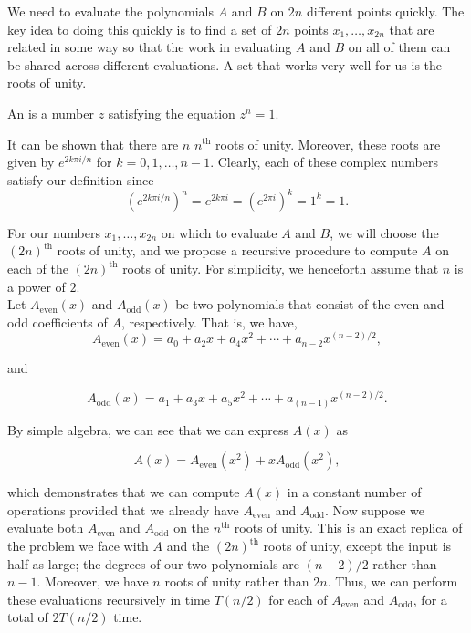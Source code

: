 We need to evaluate the polynomials $A$ and $B$ on $2n$ different points quickly. The key idea to doing this quickly is to find a set of $2n$ points $x_1, \ldots, x_{2n}$ that are related in some way so that the work in evaluating $A$ and $B$ on all of them can be shared across different evaluations. A set that works very well for us is the roots of unity. \\

\begin{definition}
An  is a number $z$ satisfying the equation $z^{n} = 1$.
\end{definition}

It can be shown that there are $n$ $n^{\text{th}}$ roots of unity. Moreover, these roots are given by $e^{2k\pi i/n}$ for $k = 0, 1, \ldots, n - 1$. Clearly, each of these complex numbers satisfy our definition since
\[
(e^{2k \pi i/n})^{n} = e^{2k \pi i} = (e^{2 \pi i})^{k} = 1^{k} = 1.
\]

For our numbers $x_1, \ldots, x_{2n}$ on which to evaluate $A$ and $B$, we will choose the $(2n)^{\text{th}}$ roots of unity, and we propose a recursive procedure to compute $A$ on each of the $(2n)^{\text{th}}$ roots of unity. For simplicity, we henceforth assume that $n$ is a power of $2$. \\

Let $A_{\text{even}}(x)$ and $A_{\text{odd}}(x)$ be two polynomials that consist of the even and odd coefficients of $A$, respectively. That is, we have,
\[
A_{\text{even}}(x) = a_0 + a_2x + a_4x^2 + \cdots + a_{n - 2}x^{(n - 2)/2},
\]

and

\[
A_{\text{odd}}(x) = a_1 + a_3x + a_5x^2 + \cdots + a_{(n - 1)}x^{(n - 2)/2}.
\]

By simple algebra, we can see that we can express $A(x)$ as 

\[
A(x) = A_{\text{even}}(x^{2}) + xA_{\text{odd}}(x^{2}),
\]

which demonstrates that we can compute $A(x)$ in a constant number of operations provided that we already have $A_{\text{even}}$ and $A_{\text{odd}}$. Now suppose we evaluate both $A_{\text{even}}$ and $A_{\text{odd}}$ on the $n^{\text{th}}$ roots of unity. This is an exact replica of the problem we face with $A$ and the $(2n)^{\text{th}}$ roots of unity, except the input is half as large; the degrees of our two polynomials are $(n - 2)/2$ rather than $n - 1$. Moreover, we have $n$ roots of unity rather than $2n$. Thus, we can perform these evaluations recursively in time $T(n/2)$ for each of $A_{\text{even}}$ and $A_{\text{odd}}$, for a total of $2T(n/2)$ time. \\


